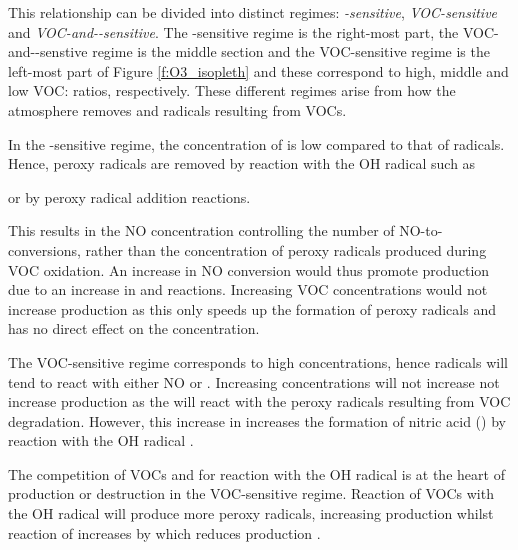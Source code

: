 This relationship can be divided into distinct regimes: \emph{-sensitive}, \emph{VOC-sensitive} and 
\emph{VOC-and--sensitive}. The -sensitive regime is the right-most part, the VOC-and--senstive 
regime is the middle section and the VOC-sensitive regime is the left-most part of Figure \ref{f:O3_isopleth} and these 
correspond to high, middle and low VOC: ratios, respectively.  These different regimes arise from how the atmosphere 
removes  and radicals resulting from VOCs. 

In the -sensitive regime, the concentration of  is low compared to that of radicals. Hence, peroxy radicals 
are removed by reaction with the OH radical such as 
\begin{reactionlist}
\end{reactionlist}
or by peroxy radical addition reactions.
\begin{reactionlist}
\end{reactionlist}
This results in the NO concentration controlling the number of NO-to- conversions, rather than the concentration of 
peroxy radicals produced during VOC oxidation. An increase in NO conversion would thus promote  production due to an 
increase in  and  reactions. Increasing VOC concentrations would not increase 
 production as this only speeds up the formation of peroxy radicals and has no direct effect on the  
concentration.

The VOC-sensitive regime corresponds to high  concentrations, hence radicals will tend to react with either NO or 
. Increasing  concentrations will not increase not increase  production as the  will react 
with the peroxy radicals resulting from VOC degradation. However, this increase in  increases the formation of nitric 
acid () by reaction with the OH radical \citep{Kleinman:1991, Kleinman:1994, Kirchner:2001}.
\begin{reactionlist}
\end{reactionlist}
The competition of VOCs and  for reaction with the OH radical is at the heart of  production or destruction in 
the VOC-sensitive regime. Reaction of VOCs with the OH radical will produce more peroxy radicals, increasing  production
whilst reaction of  increases  by  which reduces  production 
\citep{Kleinman:1991, Kleinman:1994, Kirchner:2001}.

